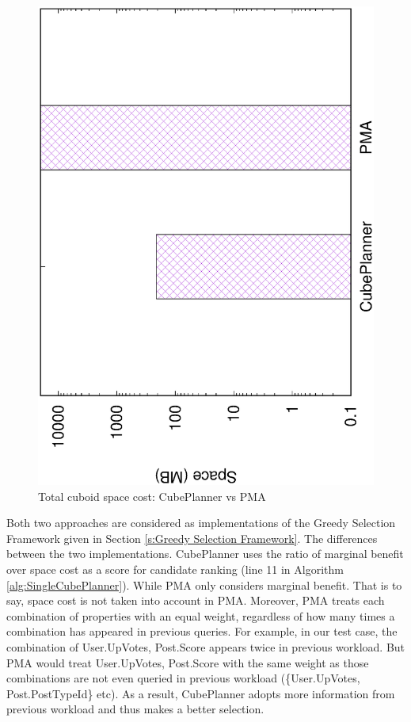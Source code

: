 \begin{figure}[H]
	\centering
	\includegraphics[scale=0.43, angle=270]{plot/jiaweispace.eps}
	\caption{Total cuboid space cost: CubePlanner vs PMA}
	\label{fig:jiaweispace}
\end{figure}

Both two approaches are considered as implementations of the Greedy Selection Framework given in Section \ref{s:Greedy Selection Framework}. The differences between the two implementations. CubePlanner uses the ratio of marginal benefit over space cost as a score for candidate ranking (line 11 in Algorithm \ref{alg:SingleCubePlanner}). While PMA only considers marginal benefit. That is to say, space cost is not taken into account in PMA. Moreover, PMA treats each combination of properties with an equal weight, regardless of how many times a combination has appeared in previous queries. For example, in our test case, the combination of {User.UpVotes, Post.Score} appears twice in previous workload. But PMA would treat {User.UpVotes, Post.Score} with the same weight as those combinations are not even queried in previous workload (\{User.UpVotes, Post.PostTypeId\} etc). As a result, CubePlanner adopts more information from previous workload and thus makes a better selection.

